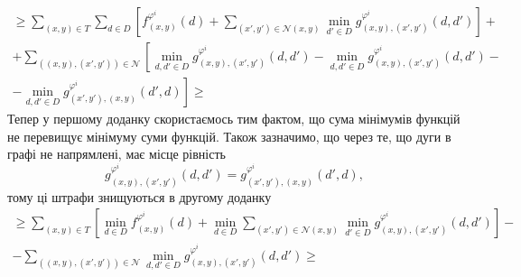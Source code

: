 \begin{equation*}
\begin{gathered}
    \ge \sum \limits_{\left(x, y \right) \in T}
        \sum \limits_{d \in D} \left[
            f_{\left(x, y \right)}^{\varphi^i} \left(d \right) +
            \sum \limits_{\left(x', y' \right) \in \mathcal{N} \left(x, y \right)}
                \min \limits_{d' \in D}
                    g_{\left(x, y \right), \left(x', y' \right)}^{\varphi^i}
                        \left(d, d' \right)
        \right] + \\
    + \sum \limits_{\left(\left(x, y \right), \left(x', y' \right) \right)\in \mathcal{N}}
    \left[
        \min\limits_{d, d' \in D}
            g_{\left(x, y \right), \left(x', y' \right)}^{\varphi^i}
                \left(d, d' \right) -
        \min\limits_{d, d' \in D}
            g_{\left(x, y \right), \left(x', y' \right)}^{\varphi^i}
                \left(d, d' \right) - \right. \\
        \left. - \min\limits_{d, d' \in D}
            g_{\left(x', y' \right), \left(x, y \right)}^{\varphi^i}
                \left(d', d \right)
    \right] \ge
\end{gathered}
\end{equation*}
Тепер у першому доданку скористаємось тим фактом,
що сума мінімумів функцій не перевищує мінімуму суми функцій.
Також зазначимо, що через те, що дуги в графі не напрямлені,
має місце рівність
\begin{equation*}
    g_{\left(x, y \right), \left(x', y' \right)}^{\varphi^i}
            \left(d, d' \right) =
    g_{\left(x', y' \right), \left(x, y \right)}^{\varphi^i}
            \left(d', d \right),
\end{equation*}
тому ці штрафи знищуються в другому доданку
\begin{equation*}
\begin{gathered}
    \ge \sum \limits_{\left(x, y \right) \in T} \left[
        \min \limits_{d \in D}
            f_{\left(x, y \right)}^{\varphi^i} \left(d \right) +
        \min \limits_{d \in D}
            \sum \limits_{\left(x', y' \right) \in \mathcal{N} \left(x, y \right)}
                \min \limits_{d' \in D}
                    g_{\left(x, y \right), \left(x', y' \right)}^{\varphi^i}
                        \left(d, d' \right)
    \right] - \\
    - \sum \limits_{\left(\left(x, y \right), \left(x', y' \right) \right) \in \mathcal{N}}
        \min \limits_{d, d' \in D}
            g_{\left(x, y \right), \left(x', y' \right)}^{\varphi^i}
                \left(d, d' \right) \ge
\end{gathered}
\end{equation*}
